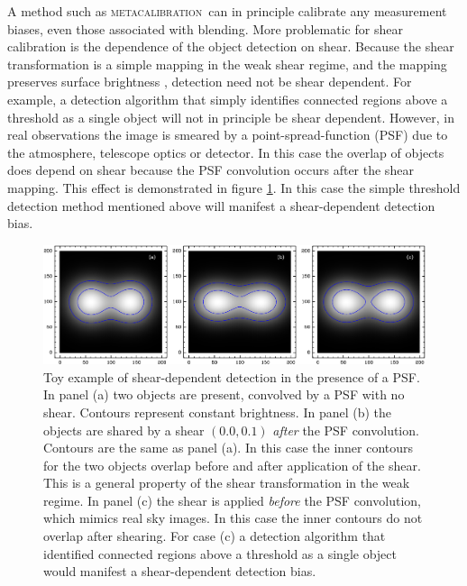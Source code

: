 \documentclass[fleqn,useAMS,usenatbib]{mnras}
\newcommand{\mcal}{\textsc{metacalibration}}
\begin{document}
A method such as \mcal\ can in principle calibrate any measurement biases, even
those associated with blending.  More problematic for shear calibration is the
dependence of the object detection on shear.  Because the shear transformation
is a simple mapping in the weak shear regime, and the mapping preserves surface
brightness \citep{SchneiderBook92}, detection need not be shear dependent.  For
example, a detection algorithm that simply identifies connected regions above a
threshold as a single object will not in principle be shear dependent. However,
in real observations the image is smeared by a point-spread-function (PSF) due
to the atmosphere, telescope optics or detector. In this case the overlap of
objects does depend on shear because the PSF convolution occurs after the shear
mapping.  This effect is demonstrated in figure \ref{fig:toy}.  In this case
the simple threshold detection method mentioned above will manifest a
shear-dependent detection bias.


\begin{figure}
    \includegraphics[width=\textwidth]{figures/toy.png}

    \caption{ Toy example of shear-dependent detection in the presence of a
    PSF.  In panel (a) two objects are present, convolved by a PSF with no
    shear.  Contours represent constant brightness.  In panel (b) the objects
    are shared by a shear $(0.0, 0.1)$ {\em after} the PSF convolution.
    Contours are the same as panel (a).  In this case the inner contours for
    the two objects overlap before and after application of the shear.  This is
    a general property of the shear transformation in the weak regime.   In
    panel (c) the shear is applied {\em before} the PSF convolution, which
    mimics real sky images.  In this case the inner contours do not overlap
    after shearing.  For case (c) a detection algorithm that identified
    connected regions above a threshold as a single object would manifest a
    shear-dependent detection bias.  \label{fig:toy} }

\end{figure}
\end{document}
